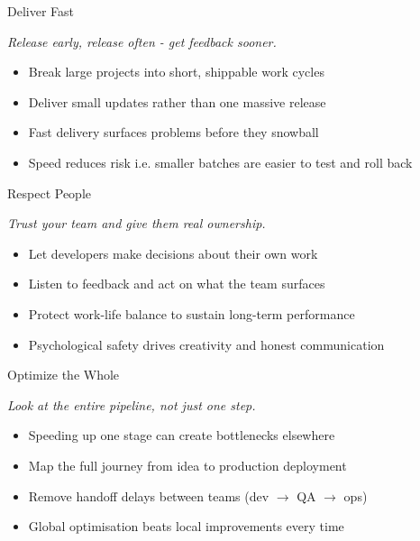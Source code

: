 \documentclass{thapathali}
\begin{document}
\begin{frame}{Deliver Fast}
    \begin{center}
        \textit{Release early, release often - get feedback sooner.}
    \end{center}
    \vspace{0.8em}
    
    \begin{itemize}
        \item Break large projects into short, shippable work cycles
        \item Deliver small updates rather than one massive release
        \item Fast delivery surfaces problems before they snowball
        \item Speed reduces risk i.e. smaller batches are easier to test and roll back
    \end{itemize}
\end{frame}

\begin{frame}{Respect People}
    \begin{center}
        \textit{Trust your team and give them real ownership.}
    \end{center}
    \vspace{0.8em}
    
    \begin{itemize}
        \item Let developers make decisions about their own work
        \item Listen to feedback and act on what the team surfaces
        \item Protect work-life balance to sustain long-term performance
        \item Psychological safety drives creativity and honest communication
    \end{itemize}
\end{frame}

\begin{frame}{Optimize the Whole}
    \begin{center}
        \textit{Look at the entire pipeline, not just one step.}
    \end{center}
    \vspace{0.8em}
    
    \begin{itemize}
        \item Speeding up one stage can create bottlenecks elsewhere
        \item Map the full journey from idea to production deployment
        \item Remove handoff delays between teams (dev $\to$ QA $\to$ ops)
        \item Global optimisation beats local improvements every time
    \end{itemize}
\end{frame}
\end{document}

